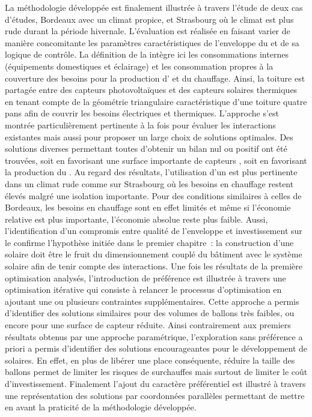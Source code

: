 La méthodologie développée est finalement illustrée à travers l’étude de deux cas
d’études, Bordeaux avec un climat propice, et Strasbourg où le climat est plus rude durant
la période hivernale. L’évaluation est réalisée en faisant varier de manière concomitante
les paramètres caractéristiques de l’enveloppe du  et de sa logique de contrôle.
La définition de la  intègre ici les consommations internes (équipements
domestiques et éclairage) et les consommation propres à la couverture des besoins pour la
production d’ et du chauffage. Ainsi, la toiture est partagée entre des capteurs
photovoltaïques et des capteurs solaires thermiques en tenant compte de la géométrie
triangulaire caractéristique d’une toiture quatre pans afin de couvrir les besoins
électriques et thermiques.
L’approche s’est montrée particulièrement pertinente à la fois pour évaluer
les interactions existantes mais aussi pour proposer un large choix de solutions
optimales. Des solutions diverses permettant toutes d’obtenir un
bilan nul ou positif ont été trouvées, soit en favorisant une surface importante de capteurs , soit
en favorisant la production du . Au regard des résultats, l’utilisation d’un
 est plus pertinente dans un climat rude comme sur Strasbourg où les besoins en chauffage restent
élevés malgré une isolation importante. Pour des conditions
similaires à celles de Bordeaux, les besoins en chauffage sont en effet limités et même si
l’économie relative est plus importante, l’économie absolue reste plus faible. Aussi,
l’identification d’un compromis entre qualité de l’enveloppe et investissement sur le
 confirme l’hypothèse initiée dans le premier chapitre~: la
construction d’une  solaire doit être le fruit du dimensionnement couplé du
bâtiment avec le système solaire afin de tenir compte des interactions. Une fois les
résultats de la première optimisation analysés, l’introduction
de préférence est illustrée à travers une optimisation itérative qui
consiste à relancer le processus d’optimisation en ajoutant une ou plusieurs contraintes
supplémentaires. Cette approche a permis d’identifier des solutions similaires pour des
volumes de ballons très faibles, ou encore pour une surface de capteur réduite. Ainsi
contrairement aux premiers résultats obtenus par une approche paramétrique, l’exploration
sans préférence a priori a permis d’identifier des solutions encourageantes pour le
développement de  solaires. En effet, en plus de libérer une place conséquente,
réduire la taille des ballons permet de limiter les risques de surchauffes mais surtout de
limiter le coût d’investissement. Finalement l’ajout du caractère préférentiel est illustré à travers
une représentation des solutions par coordonnées parallèles permettant de mettre en avant
la praticité de la méthodologie développée.


